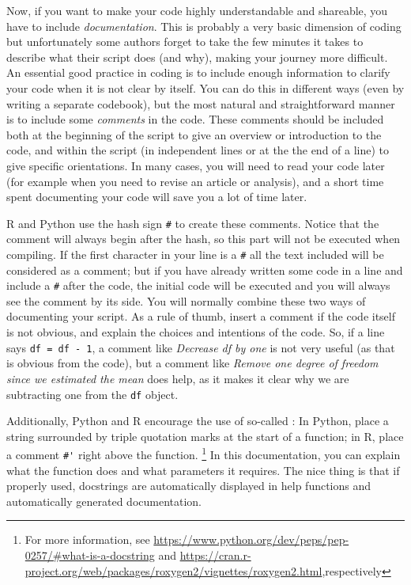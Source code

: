 Now, if you want to make your code highly understandable and shareable, you have to include \textit{documentation}.
This is probably a very basic dimension of coding but unfortunately some authors forget to take the few minutes it takes to describe what their script does (and why), making your journey more difficult.
An essential good practice in coding is to include enough information to clarify your code when it is not clear by itself.
You can do this in different ways (even by writing a separate codebook), but the most natural and straightforward manner is to include some  \textit{comments} in the code.
These comments should be included both at the beginning of the script to give an overview or introduction to the code,
and within the script (in independent lines or at the the end of a line) to give specific orientations.
In many cases, you will need to read your code later (for example when you need to revise an article or analysis), and a short time spent documenting your code will save you a lot of time later.

R and Python use the hash sign \texttt{\#} to create these comments. Notice that the comment will always begin  after the hash, so this part will not be executed when compiling. If the first character in your line is  a \texttt{\#} all the text included will be considered as a comment; but if you have already written some code in a line and include a \texttt{\#} after the code, the initial code will be executed and you will always see the comment by its side. You will normally combine these two ways of documenting your script.
As a rule of thumb, insert a comment if the code itself is not obvious,
and explain the choices and intentions of the code.
So, if a line says \verb|df = df - 1|, a comment like \emph{Decrease df by one} is not very useful (as that is obvious from the code), but a comment like \emph{Remove one degree of freedom since we estimated the mean} does help, as it makes it clear why we are subtracting one from the \verb|df| object.

Additionally, Python and R encourage the use of so-called :
In Python, place a string surrounded by triple quotation marks at the start of a function; in R, place a comment \verb|#'| right above the function.
\footnote{For more information, see \url{https://www.python.org/dev/peps/pep-0257/\#what-is-a-docstring} and \url{https://cran.r-project.org/web/packages/roxygen2/vignettes/roxygen2.html},respectively}
In this documentation, you can explain what the function does and what parameters it requires.
The nice thing is that if properly used, docstrings are automatically displayed in help functions and automatically generated documentation.

